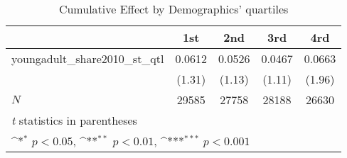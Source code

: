 \begin{table}[htbp]\centering
\def\sym#1{\ifmmode^{#1}\else\(^{#1}\)\fi}
\caption{Cumulative Effect by Demographics' quartiles}
\begin{tabular}{l*{4}{c}}
\hline\hline
            &\multicolumn{1}{c}{1st}&\multicolumn{1}{c}{2nd}&\multicolumn{1}{c}{3rd}&\multicolumn{1}{c}{4rd}\\
\hline
youngadult\_share2010\_st\_qtl&      0.0612         &      0.0526         &      0.0467         &      0.0663         \\
            &      (1.31)         &      (1.13)         &      (1.11)         &      (1.96)         \\
\hline
\(N\)       &       29585         &       27758         &       28188         &       26630         \\
\hline\hline
\multicolumn{5}{l}{\footnotesize \textit{t} statistics in parentheses}\\
\multicolumn{5}{l}{\footnotesize \sym{*} \(p<0.05\), \sym{**} \(p<0.01\), \sym{***} \(p<0.001\)}\\
\end{tabular}
\end{table}
